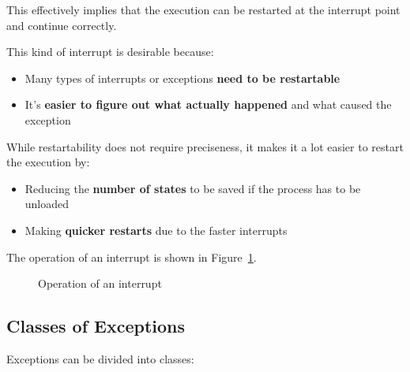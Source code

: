 \documentclass[english]{article}
\begin{document}
This effectively implies that the execution can be restarted at the interrupt point and continue correctly.

\bigskip
This kind of interrupt is desirable because:

\begin{itemize}
  \item Many types of interrupts or exceptions \textbf{need to be restartable}
  \item It's \textbf{easier to figure out what actually happened} and what caused the exception
\end{itemize}

While restartability does not require preciseness, it makes it a lot easier to restart the execution by:

\begin{itemize}
  \item Reducing the \textbf{number of states} to be saved if the process has to be unloaded
  \item Making \textbf{quicker restarts} due to the faster interrupts
\end{itemize}

\bigskip
The operation of an interrupt is shown in Figure~\ref{fig:operation-interrupt}.

\begin{figure}
  \bigskip
  \centering
  \caption{Operation of an interrupt}
  \label{fig:operation-interrupt}
  \bigskip
\end{figure}

\subsection{Classes of Exceptions}

Exceptions can be divided into classes:
\end{document}

